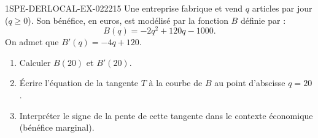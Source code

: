 \begin{exercice}{1SPE-DERLOCAL-EX-022}{2}{15}
Une entreprise fabrique et vend $q$ articles par jour ($q \geqslant 0$). Son bénéfice, en euros, est modélisé par la fonction $B$ définie par :
\[
B(q) = -2q^2 + 120q - 1000.
\]
On admet que $B'(q) = -4q + 120$.

\begin{enumerate}
  \item Calculer $B(20)$ et $B'(20)$.
  \item Écrire l'équation de la tangente $T$ à la courbe de $B$ au point d'abscisse $q = 20$.
  \item Interpréter le signe de la pente de cette tangente dans le contexte économique (bénéfice marginal).
\end{enumerate}
\end{exercice}
